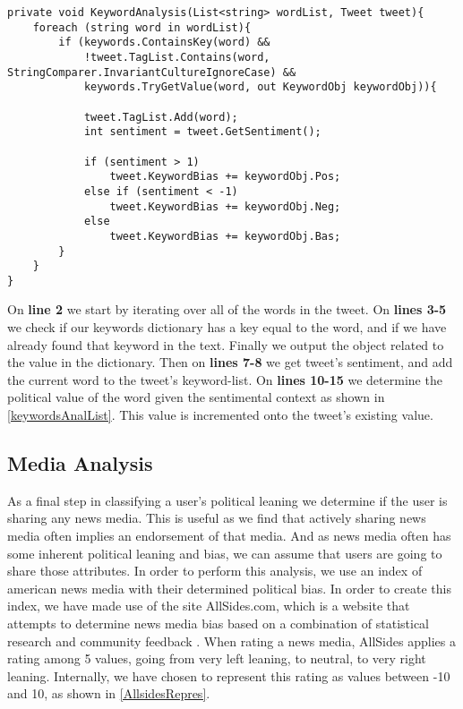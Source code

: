\begin{minipage}[H]{\linewidth}
\begin{lstlisting}[caption = Method for handling the keyword analysis, label = keywordAnalysisExample] 
private void KeywordAnalysis(List<string> wordList, Tweet tweet){
	foreach (string word in wordList){
    	if (keywords.ContainsKey(word) && 
            !tweet.TagList.Contains(word, StringComparer.InvariantCultureIgnoreCase) && 
            keywords.TryGetValue(word, out KeywordObj keywordObj)){
                        
        	tweet.TagList.Add(word);
            int sentiment = tweet.GetSentiment();

            if (sentiment > 1)
            	tweet.KeywordBias += keywordObj.Pos;
            else if (sentiment < -1)
            	tweet.KeywordBias += keywordObj.Neg;
            else
            	tweet.KeywordBias += keywordObj.Bas;
		}
	}
}
\end{lstlisting}
\end{minipage}

On \textbf{line 2} we start by iterating over all of the words in the tweet. On
\textbf{lines 3-5} we check if our keywords dictionary has a key equal to the
word, and if we have already found that keyword in the text. Finally we output
the  object related to the value in the dictionary. Then on
\textbf{lines 7-8} we get tweet's sentiment, and  add the current word to the
tweet's keyword-list. On \textbf{lines 10-15} we determine the political value
of the word given the sentimental context as shown in
\autoref{keywordsAnalList}. This value is incremented onto the tweet's existing
 value.

\subsection{Media Analysis}
As a final step in classifying a user's political leaning we determine if the
user is sharing any news media. This is useful as we find that actively sharing
news media often implies an endorsement of that media. And as news media often
has some inherent political leaning and bias, we can assume that users are going
to share those attributes. In order to perform this analysis, we use an index of
american news media with their determined political bias. In order to create
this index, we have made use of the site AllSides.com, which is a website that
attempts to determine news media bias based on a combination of statistical
research and community feedback \citep{allSidesMedia}. When rating a news
media, AllSides applies a rating among 5 values, going from very left
leaning, to neutral, to very right leaning. Internally, we have chosen to
represent this rating as values between -10 and 10, as shown in
\autoref{AllsidesRepres}.\\

